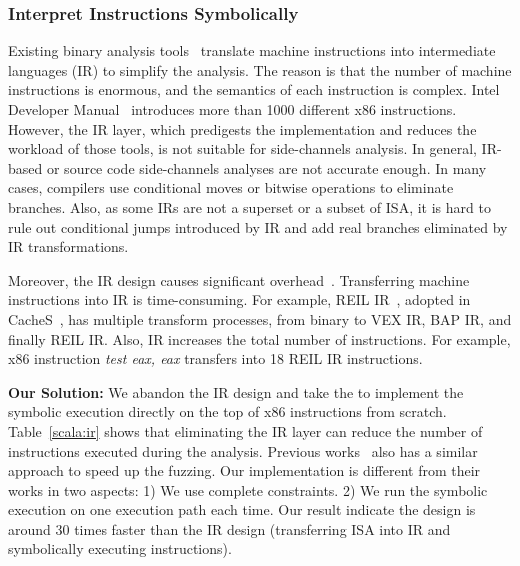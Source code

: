 \subsubsection{Interpret Instructions Symbolically}
Existing binary analysis tools~\cite{shoshitaishvili2016state,
10.1007/978-3-642-22110-1_37} translate machine instructions into
intermediate languages (IR) to simplify the analysis. 
The reason is that the number of machine instructions is
enormous, and the semantics of each instruction is complex. Intel Developer
Manual~\cite{intelsys} introduces more than 1000 different x86 instructions. 
However, the IR layer, which predigests the implementation
and reduces the workload of those tools, is not suitable for side-channels 
analysis.
In general, IR-based or source code side-channels analyses are not accurate enough.
In many cases, compilers use conditional moves or bitwise operations to eliminate
branches. Also, as some IRs are not a superset or a subset of ISA, 
it is hard to rule out conditional jumps introduced by IR and add real branches 
eliminated by IR transformations.

Moreover, the IR design causes significant overhead~\cite{217563}.
Transferring machine instructions into IR is time-consuming. For example,
REIL IR~\cite{dullien2009reil}, adopted in CacheS~\cite{236338}, has multiple
transform processes, from binary to VEX IR, BAP IR, and finally REIL IR\@. 
Also, IR increases the total number of instructions. For example, x86
instruction \textit{test eax, eax} transfers into 18 REIL IR instructions. 

\textbf{Our Solution:}
We abandon the IR design and take the  to implement 
the symbolic execution directly on the top of x86 instructions from scratch. 
Table~\ref{scala:ir} shows that eliminating the IR layer can reduce the number 
of instructions executed during the analysis. Previous works~\cite{217563} also 
has a similar approach to speed up the fuzzing. Our implementation is different
from their works in two aspects: 1) We use complete constraints. 2) We run the
symbolic execution on one execution path each time. Our result indicate the 
design is around 30 times faster than the IR design (transferring ISA into IR and
symbolically executing instructions).

